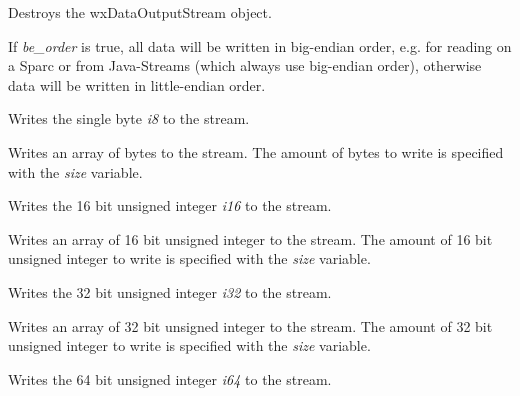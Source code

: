 Destroys the wxDataOutputStream object.

\label{wxdataoutputstreambigendianorder}


If {\it be\_order} is true, all data will be written in big-endian
order, e.g. for reading on a Sparc or from Java-Streams (which
always use big-endian order), otherwise data will be written in
little-endian order.
 
\label{wxdataoutputstreamwrite8}


Writes the single byte {\it i8} to the stream.


Writes an array of bytes to the stream. The amount of bytes to write is
specified with the {\it size} variable.

\label{wxdataoutputstreamwrite16}


Writes the 16 bit unsigned integer {\it i16} to the stream.


Writes an array of 16 bit unsigned integer to the stream. The amount of
16 bit unsigned integer to write is specified with the {\it size} variable.

\label{wxdataoutputstreamwrite32}


Writes the 32 bit unsigned integer {\it i32} to the stream.


Writes an array of 32 bit unsigned integer to the stream. The amount of
32 bit unsigned integer to write is specified with the {\it size} variable.

\label{wxdataoutputstreamwrite64}


Writes the 64 bit unsigned integer {\it i64} to the stream.

